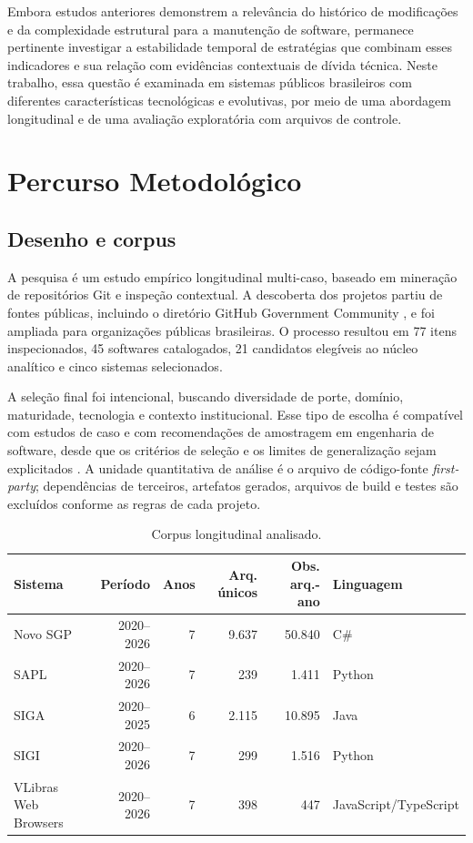 \documentclass[12pt]{article}
\begin{document}
Embora estudos anteriores demonstrem a relevância do histórico de modificações e da complexidade estrutural para a manutenção de software, permanece pertinente investigar a estabilidade temporal de estratégias que combinam esses indicadores e sua relação com evidências contextuais de dívida técnica. Neste trabalho, essa questão é examinada em sistemas públicos brasileiros com diferentes características tecnológicas e evolutivas, por meio de uma abordagem longitudinal e de uma avaliação exploratória com arquivos de controle.

\section{Percurso Metodológico}

\subsection{Desenho e corpus}

A pesquisa é um estudo empírico longitudinal multi-caso, baseado em mineração de repositórios Git e inspeção contextual. A descoberta dos projetos partiu de fontes públicas, incluindo o diretório GitHub Government Community \cite{githubgovernment}, e foi ampliada para organizações públicas brasileiras. O processo resultou em 77 itens inspecionados, 45 softwares catalogados, 21 candidatos elegíveis ao núcleo analítico e cinco sistemas selecionados.

A seleção final foi intencional, buscando diversidade de porte, domínio, maturidade, tecnologia e contexto institucional. Esse tipo de escolha é compatível com estudos de caso e com recomendações de amostragem em engenharia de software, desde que os critérios de seleção e os limites de generalização sejam explicitados \cite{runeson2009casestudy,baltes2022sampling}. A unidade quantitativa de análise é o arquivo de código-fonte \emph{first-party}; dependências de terceiros, artefatos gerados, arquivos de build e testes são excluídos conforme as regras de cada projeto.

\begin{table}[H]
\centering
\caption{Corpus longitudinal analisado.}
\label{tab:corpus}
\small
\begin{tabular}{lrrrrl}
\toprule
\textbf{Sistema} & \textbf{Período} & \textbf{Anos} & \textbf{Arq. únicos} & \textbf{Obs. arq.-ano} & \textbf{Linguagem} \\
\midrule
Novo SGP & 2020--2026 & 7 & 9.637 & 50.840 & C\# \\
SAPL & 2020--2026 & 7 & 239 & 1.411 & Python \\
SIGA & 2020--2025 & 6 & 2.115 & 10.895 & Java \\
SIGI & 2020--2026 & 7 & 299 & 1.516 & Python \\
VLibras Web Browsers & 2020--2026 & 7 & 398 & 447 & JavaScript/TypeScript \\
\bottomrule
\end{tabular}
\end{table}
\end{document}
